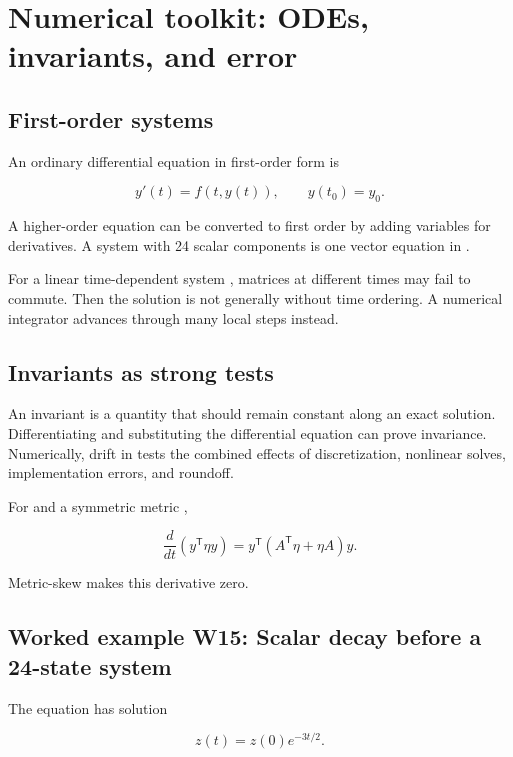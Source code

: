 \documentclass[11pt]{article}
\begin{document}
\section{Numerical toolkit: ODEs, invariants, and error}

\subsection{First-order systems}

An ordinary differential equation in first-order form is

\[
y'(t)=f(t,y(t)),\qquad y(t_0)=y_0.
\]

A higher-order equation can be converted to first order by adding variables for derivatives. A system with 24 scalar components is one vector equation in \texttt{}.

For a linear time-dependent system \texttt{}, matrices at different times may fail to commute. Then the solution is not generally \texttt{} without time ordering. A numerical integrator advances through many local steps instead.

\subsection{Invariants as strong tests}

An invariant is a quantity \texttt{} that should remain constant along an exact solution. Differentiating \texttt{} and substituting the differential equation can prove invariance. Numerically, drift in \texttt{} tests the combined effects of discretization, nonlinear solves, implementation errors, and roundoff.

For \texttt{} and a symmetric metric \texttt{},

\[
\frac{d}{dt}(y^{\mathsf T}\eta y)
=y^{\mathsf T}(A^{\mathsf T}\eta+\eta A)y.
\]

Metric-skew \texttt{} makes this derivative zero.

\subsection{Worked example W15: Scalar decay before a 24-state system}

The equation \texttt{} has solution

\[
z(t)=z(0)e^{-3t/2}.
\]
\end{document}
